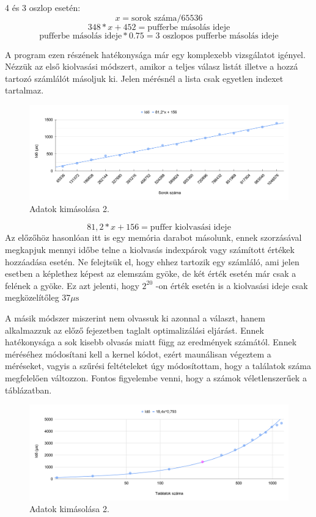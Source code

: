 4 és 3 oszlop esetén:
$$ x = \text{sorok száma} / 65536 $$
$$ 348*x + 452 = \text{pufferbe másolás ideje} $$ 
$$ \text{pufferbe másolás ideje} * 0.75 = \text{3 oszlopos pufferbe másolás ideje}  $$




A program ezen részének hatékonysága már egy komplexebb vizsgálatot igényel.
Nézzük az első kiolvasási módszert, amikor a teljes válasz listát illetve a hozzá tartozó számlálót másoljuk ki.
Jelen mérésnél a lista csak egyetlen indexet tartalmaz. 

\begin{figure}[h!]
\centering
\includegraphics[width=\textwidth]{images/outpuffer.png}
\caption{Adatok kimásolása 2.}
\label{fig:schema}
\end{figure}

$$ 81,2*x + 156 = \text{puffer kiolvasási ideje} $$ 
Az előzőhöz hasonlóan itt is egy memória darabot másolunk, ennek szorzásával megkapjuk mennyi időbe telne a kiolvasás indexpárok vagy számított értékek hozzáadása esetén.
Ne felejtsük el, hogy ehhez tartozik egy számláló, ami jelen esetben a képlethez képest az elemszám gyöke, de két érték esetén már csak a felének a gyöke.
Ez azt jelenti, hogy $2^{20}$ -on érték esetén is a kiolvasási ideje csak megközelítőleg 37$\mu\text{s}$


A másik módszer miszerint nem olvassuk ki azonnal a választ, hanem alkalmazzuk az előző fejezetben taglalt optimalizálási eljárást.
Ennek hatékonysága a sok kisebb olvasás miatt függ az eredmények számától. Ennek méréséhez módosítani kell a kernel kódot, ezért maunálisan végeztem a méréseket, vagyis a szűrési feltételeket úgy módosítottam, hogy a találatok száma megfelelően változzon.
Fontos figyelembe venni, hogy a számok véletlenszerűek a táblázatban.

\begin{figure}[h!]
\centering
\includegraphics[width=\textwidth]{images/outpuffer2.png}
\caption{Adatok kimásolása 2.}
\label{fig:schema}
\end{figure}


